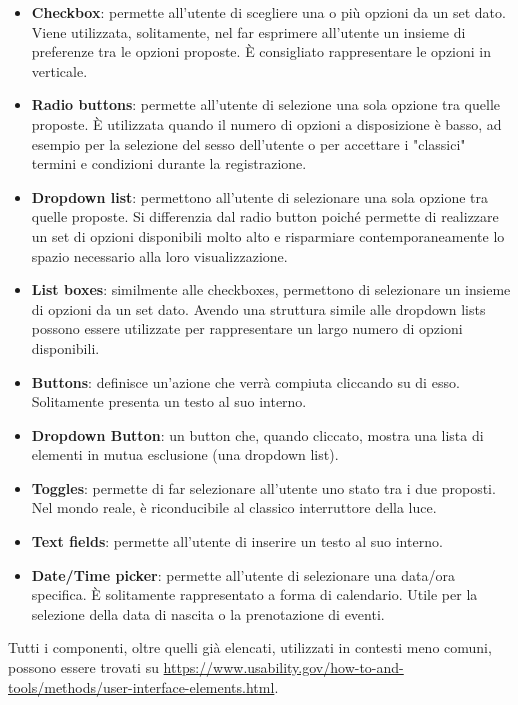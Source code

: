 \begin{itemize}
	\item \textbf{Checkbox}: permette all'utente di scegliere una o più opzioni da un set dato. Viene utilizzata, solitamente, nel far esprimere all'utente un insieme di preferenze tra le opzioni proposte. È consigliato rappresentare le opzioni in verticale.
	\item \textbf{Radio buttons}: permette all'utente di selezione una sola opzione tra quelle proposte. È utilizzata quando il numero di opzioni a disposizione è basso, ad esempio per la selezione del sesso dell'utente o per accettare i "classici" termini e condizioni durante la registrazione.
	\item \textbf{Dropdown list}: permettono all'utente di selezionare una sola opzione tra quelle proposte. Si differenzia dal radio button poiché permette di realizzare un set di opzioni disponibili molto alto e risparmiare contemporaneamente lo spazio necessario alla loro visualizzazione.
	\item \textbf{List boxes}: similmente alle checkboxes, permettono di selezionare un insieme di opzioni da un set dato. Avendo una struttura simile alle dropdown lists possono essere utilizzate per rappresentare un largo numero di opzioni disponibili.
	\item \textbf{Buttons}: definisce un'azione che verrà compiuta cliccando su di esso. Solitamente presenta un testo al suo interno.
	\item \textbf{Dropdown Button}: un button che, quando cliccato, mostra una lista di elementi in mutua esclusione (una dropdown list).
	\item \textbf{Toggles}: permette di far selezionare all'utente uno stato tra i due proposti. Nel mondo reale, è riconducibile al classico interruttore della luce.
	\item \textbf{Text fields}: permette all'utente di inserire un testo al suo interno.
	\item \textbf{Date/Time picker}: permette all'utente di selezionare una data/ora specifica. È solitamente rappresentato a forma di calendario. Utile per la selezione della data di nascita o la prenotazione di eventi.
\end{itemize}

Tutti i componenti, oltre quelli già elencati, utilizzati in contesti meno comuni, possono essere trovati su \url{https://www.usability.gov/how-to-and-tools/methods/user-interface-elements.html}.

\pagebreak
